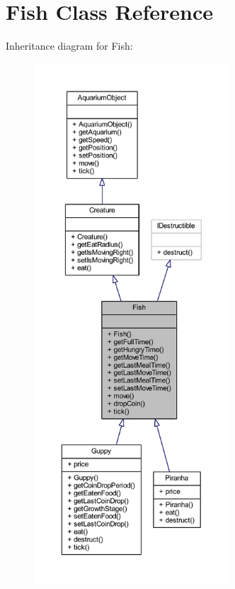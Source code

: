 \hypertarget{class_fish}{}\section{Fish Class Reference}
\label{class_fish}


Inheritance diagram for Fish\+:
\nopagebreak
\begin{figure}[H]
\begin{center}
\leavevmode
\includegraphics[height=550pt]{class_fish__inherit__graph}
\end{center}
\end{figure}


